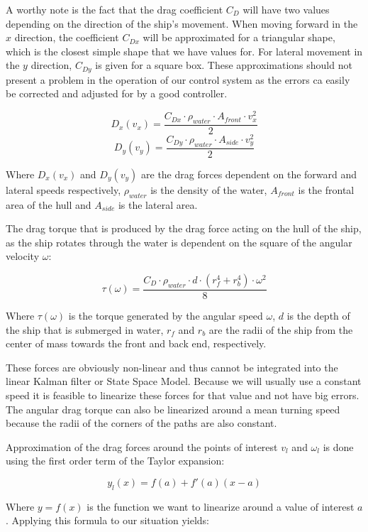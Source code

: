 A worthy note is the fact that the drag coefficient $ C_{D} $ will have two values depending on the direction of the ship's movement. When moving forward in the $x$ direction, the coefficient $ C_{Dx} $ will be approximated for a triangular shape, which is the closest simple shape that we have values for. For lateral movement in the $y$ direction, $ C_{Dy} $ is given for a square box. These approximations should not present a problem in the operation of our control system as the errors ca easily be corrected and adjusted for by a good controller.

\[ D_{x}(v_{x}) = \frac{C_{Dx}\cdot\rho_{water}\cdot A_{front}\cdot v_{x}^{2}}{2} \]
\[ D_{y}(v_{y}) = \frac{C_{Dy}\cdot\rho_{water}\cdot A_{side}\cdot  v_{y}^{2}}{2} \]

Where $ D_{x}(v_{x}) $ and $ D_{y}(v_{y})$ are the drag forces dependent on the forward and lateral speeds respectively, $ \rho_{water} $ is the density of the water, $ A_{front} $ is the frontal area of the hull and $ A_{side} $ is the lateral area. 

The drag torque that is produced by the drag force acting on the hull of the ship, as the ship rotates through the water is dependent on the square of the angular velocity $ \omega $:

\[ \tau(\omega) = \frac{C_{D} \cdot \rho_{water} \cdot d \cdot (r_{f}^{4} + r_{b}^{4}) \cdot \omega^{2}}{8} \]

Where $ \tau(\omega) $ is the torque generated by the angular speed $ \omega $, $ d  $ is the depth of the ship that is submerged in water, $ r_{f} $ and $ r_{b} $ are the radii of the ship from the center of mass towards the front and back end, respectively.

These forces are obviously non-linear and thus cannot be integrated into the linear Kalman filter or State Space Model. Because we will usually use a constant speed it is feasible to linearize these forces for that value and not have big errors. The angular drag torque can also be linearized around a mean turning speed because the radii of the corners of the paths are also constant.

Approximation of the drag forces around the points of interest $v_{l} $ and $\omega_{l}$ is done using the first order term of the Taylor expansion:

\[ y_{l}(x) = f(a) + f'(a)(x-a) \]

Where $y = f(x)$ is the function we want to linearize around a value of interest $a$. Applying this formula to our situation yields:

